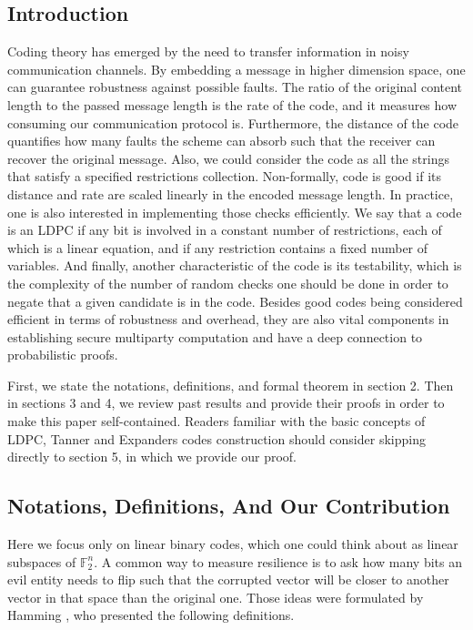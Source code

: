 \documentclass{article}
\begin{document}
\begin{multicols*}{2}
  \section{Introduction}
  Coding theory has emerged by the need to transfer information in noisy communication channels. By embedding a message in higher dimension space, one can guarantee robustness against possible faults. The ratio of the original content length to the passed message length is the rate of the code, and it measures how consuming our communication protocol is. Furthermore, the distance of the code quantifies how many faults the scheme can absorb such that the receiver can recover the original message. Also, we could consider the code as all the strings that satisfy a specified restrictions collection.
  Non-formally, code is good if its distance and rate are scaled linearly in the encoded message length. In practice, one is also interested in implementing those checks efficiently. We say that a code is an LDPC if any bit is involved in a constant number of restrictions, each of which is a linear equation, and if any restriction contains a fixed number of variables. And finally, another characteristic of the code is its testability, which is the complexity of the number of random checks one should be done in order to negate that a given candidate is in the code.
  Besides good codes being considered efficient in terms of robustness and overhead, they are also vital components in establishing secure multiparty computation \cite{MultiParty} and have a deep connection to probabilistic proofs.

  First, we state the notations, definitions, and formal theorem in section 2. Then in sections 3 and 4, we review past results and provide their proofs in order to make this paper self-contained. Readers familiar with the basic concepts of LDPC, Tanner and Expanders codes construction should consider skipping directly to section 5, in which we provide our proof. 
  \subsection{Notations, Definitions, And Our Contribution}
  Here we focus only on linear binary codes, which one could think about as linear subspaces of $\mathbb{F}_{2}^{n}$. A common way to measure resilience is to ask how many bits an evil entity needs to flip such that the corrupted vector will be closer to another vector in that space than the original one. Those ideas were formulated by Hamming \cite{Hamming}, who presented the following definitions. 

\end{multicols*}
\end{document}
